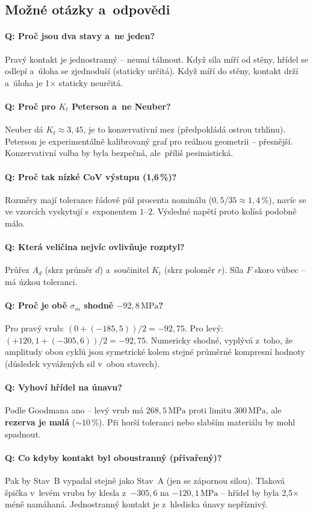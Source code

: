 \documentclass[a4paper,11pt]{article}
\newcommand{\unit}[1]{\,\mathrm{#1}}
\begin{document}
\subsection{Možné otázky a~odpovědi}

\paragraph{Q: Proč jsou dva stavy a~ne jeden?}
Pravý kontakt je jednostranný -- neumí táhnout. Když síla míří od stěny, hřídel se odlepí a~úloha se zjednoduší (staticky určitá). Když míří do stěny, kontakt drží a~úloha je 1$\times$ staticky neurčitá.

\paragraph{Q: Proč pro $K_t$ Peterson a~ne Neuber?}
Neuber dá $K_t \approx 3{,}45$, je to konzervativní mez (předpokládá ostrou trhlinu). Peterson je experimentálně kalibrovaný graf pro reálnou geometrii -- přesnější. Konzervativní volba by byla bezpečná, ale~příliš pesimistická.

\paragraph{Q: Proč tak nízké CoV výstupu (1{,}6\,\%)?}
Rozměry mají tolerance řádově půl procenta nominálu ($0{,}5/35 \approx 1{,}4\,\%$), navíc se ve vzorcích vyskytují s~exponentem $1$--$2$. Výsledné napětí proto kolísá podobně málo.

\paragraph{Q: Která veličina nejvíc ovlivňuje rozptyl?}
Průřez $A_d$ (skrz průměr $d$) a~součinitel $K_t$ (skrz poloměr $r$). Síla $F$ skoro vůbec -- má úzkou toleranci.

\paragraph{Q: Proč je obě $\sigma_m$ shodně $-92{,}8\unit{MPa}$?}
Pro pravý vrub: $(0 + (-185{,}5))/2 = -92{,}75$. Pro levý: $(+120{,}1 + (-305{,}6))/2 = -92{,}75$. Numericky shodné, vyplývá z~toho, že amplitudy obou cyklů jsou symetrické kolem stejné průměrné kompresní hodnoty (důsledek vyvážených sil v~obou stavech).

\paragraph{Q: Vyhoví hřídel na únavu?}
Podle Goodmana ano -- levý vrub má $268{,}5\unit{MPa}$ proti limitu $300\unit{MPa}$, ale \textbf{rezerva je malá} ($\sim 10\,\%$). Při horší toleranci nebo slabším materiálu by mohl spadnout.

\paragraph{Q: Co kdyby kontakt byl oboustranný (přivařený)?}
Pak by Stav~B vypadal stejně jako Stav~A (jen se zápornou silou). Tlaková špička v~levém vrubu by klesla z~$-305{,}6$ na $-120{,}1\unit{MPa}$ -- hřídel by byla 2{,}5$\times$ méně namáhaná. Jednostranný kontakt je z~hlediska únavy nepříznivý.
\end{document}
